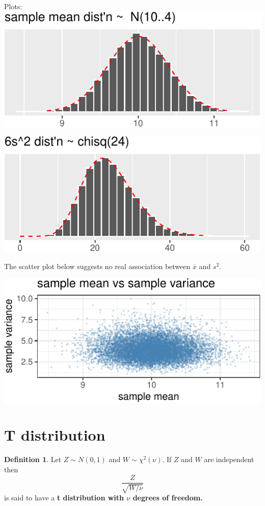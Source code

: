 \documentclass[
]{book}
\theoremstyle{definition}
\newtheorem{definition}{Definition}[chapter]
\theoremstyle{definition}
\theoremstyle{definition}
\theoremstyle{definition}
\theoremstyle{remark}
\begin{document}
Plots:
\includegraphics{math340-notes_files/figure-latex/unnamed-chunk-28-1.pdf}

\includegraphics{math340-notes_files/figure-latex/unnamed-chunk-29-1.pdf}

The scatter plot below suggests no real association between \(\overline{x}\) and \(s^2\).

\includegraphics{math340-notes_files/figure-latex/unnamed-chunk-30-1.pdf}

\section{T distribution}\label{t-distribution}

\begin{definition}
\protect\hypertarget{def:t-distribution}{}\label{def:t-distribution}Let \(Z \sim N(0,1)\) and \(W \sim \chi^2(\nu)\). If \(Z\) and \(W\) are independent then \[\frac{Z}{\sqrt{W/\nu}}\] is said to have a \textbf{t distribution with \(\nu\) degrees of freedom.}
\end{definition}
\end{document}
